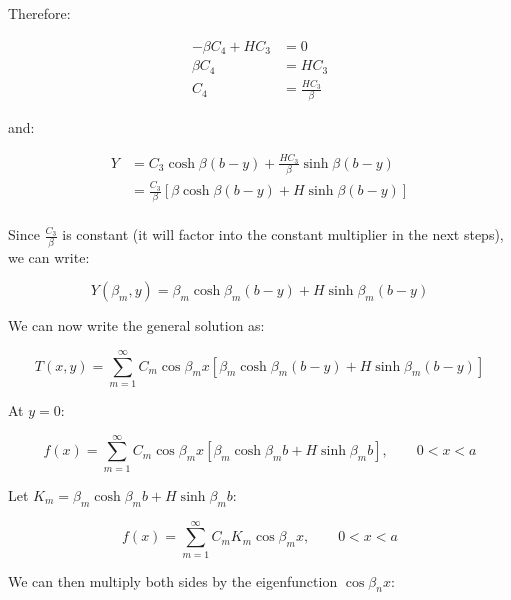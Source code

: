 \documentclass[letterpaper,12pt]{article}
\begin{document}
Therefore:

\begin{equation}
\begin{aligned}
    -\beta C_4 + H C_3 &= 0 \\
    \beta C_4          &= H C_3 \\
    C_4                &= \frac{H C_3}{\beta}
\end{aligned}
\end{equation}

and:

\begin{equation}
\begin{aligned}
    Y &= C_3 \cosh{\beta (b- y)} + \frac{H C_3}{\beta} \sinh{\beta (b - y)} \\
      & = \frac{C_3}{\beta} \left[ \beta \cosh{\beta (b- y)} + H \sinh{\beta (b - y)} \right] \\
\end{aligned}
\end{equation}

Since $\frac{C_3}{\beta}$ is constant (it will factor into the constant multiplier in the next steps), we can write:

\begin{equation}
    Y(\beta_m, y) = \beta_m \cosh{\beta_m (b- y)} + H \sinh{\beta_m (b - y)} 
\end{equation}

We can now write the general solution as:

\begin{equation}
    T(x, y) = \sum_{m = 1}^{\infty} C_m \cos{\beta_m x} \left[ \beta_m \cosh{\beta_m (b- y)} + H \sinh{\beta_m (b - y)} \right]
\end{equation}

At $y = 0$:

\begin{equation}
    f(x) = \sum_{m = 1}^{\infty} C_m \cos{\beta_m x} \left[ \beta_m \cosh{\beta_m b} + H \sinh{\beta_m b} \right], \qquad 0 < x < a
\end{equation}


Let $K_m = \beta_m \cosh{\beta_m b} + H \sinh{\beta_m b}$:

\begin{equation}
    f(x) = \sum_{m = 1}^{\infty} C_m K_m \cos{\beta_m x}, \qquad 0 < x < a
\end{equation}

We can then multiply both sides by the eigenfunction $\cos{\beta_n x}$:
\end{document}
